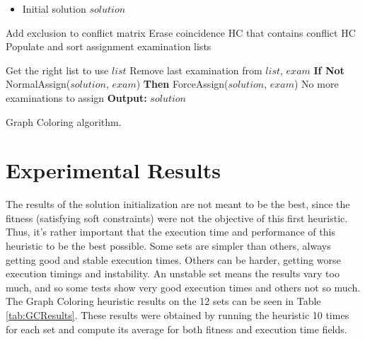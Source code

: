 
\begin{algorithm}
\begin{itemize}
\item Initial solution $solution$
\end{itemize}

\begin{algorithmic}[1]
\State Add exclusion to conflict matrix
\State Erase coincidence HC that contains conflict HC
\State Populate and sort assignment examination lists

\Repeat
	\State Get the right list to use $list$
	\State Remove last examination from $list$, $exam$
	\State \textbf{If Not} NormalAssign($solution$, $exam$) \textbf{Then} ForceAssign($solution$, $exam$)
\Until No more examinations to assign
\State  \textbf{Output:} $solution$
\end{algorithmic}
\caption{Graph Coloring algorithm.}
\label{alg:GraphColoring}
\end{algorithm}

\section{Experimental Results}

The results of the solution initialization are not meant to be the best, since the fitness (satisfying soft constraints) were not the objective of this first heuristic. Thus, it's rather important that the execution time and performance of this heuristic to be the best possible. Some sets are simpler than others, always getting good and stable execution times. Others can be harder, getting worse execution timings and instability. An unstable set means the results vary too much, and so some tests show very good execution times and others not so much. The Graph Coloring heuristic results on the 12 sets can be seen in Table \ref{tab:GCResults}. These results were obtained by running the heuristic 10 times for each set and compute its average for both fitness and execution time fields.\\

